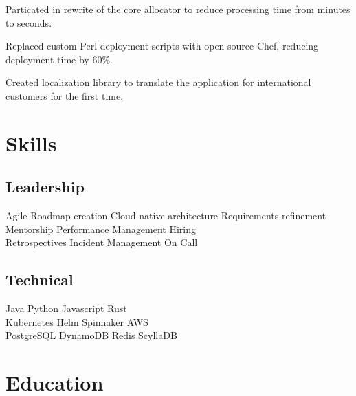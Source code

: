 \documentclass[]{deedy-resume-openfont}
\begin{document}
\sectionsep
{}
\vspace{\topsep}
\begin{tightemize}
\item Particated in rewrite of the core allocator to reduce processing time from minutes to seconds.
\item Replaced custom Perl deployment scripts with open-source Chef, reducing deployment time by 60\%.
\item Created localization library to translate the application for international customers for the first time.
\end{tightemize}



\section{Skills}
\begin{minipage}[t]{.55\textwidth}
\subsection{Leadership}
Agile \textbullet{} Roadmap creation \textbullet{} Cloud native architecture \textbullet{} Requirements refinement \\
\vspace{\topsep}
Mentorship \textbullet{} Performance Management \textbullet{} Hiring \\
\vspace{\topsep}
Retrospectives \textbullet{} Incident Management \textbullet{} On Call
\sectionsep
\end{minipage}
\hfill
\begin{minipage}[t]{.4\textwidth}
\subsection{Technical}
 Java \textbullet{} Python \textbullet{} Javascript \textbullet{} Rust \\
\vspace{\topsep}
 Kubernetes \textbullet{} Helm \textbullet{} Spinnaker \textbullet{} AWS \\
\vspace{\topsep}
 PostgreSQL \textbullet{} DynamoDB \textbullet{} Redis \textbullet{} ScyllaDB
\end{minipage}

\sectionsep

\section{Education}
\sectionsep

\sectionsep
\end{document}
